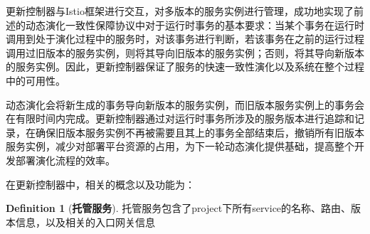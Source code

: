 \documentclass[a4paper, 12pt]{article}
\theoremstyle{definition}
\newtheorem{definition}{Definition}[section]
\begin{document}
更新控制器与Istio框架进行交互，对多版本的服务实例进行管理，成功地实现了前述的动态演化一致性保障协议中对于运行时事务的基本要求：当某个事务在运行时调用到处于演化过程中的服务时，对该事务进行判断，若该事务在之前的运行过程调用过旧版本的服务实例，则将其导向旧版本的服务实例；否则，将其导向新版本的服务实例。因此，更新控制器保证了服务的快速一致性演化以及系统在整个过程中的可用性。

动态演化会将新生成的事务导向新版本的服务实例，而旧版本服务实例上的事务会在有限时间内完成。更新控制器通过对运行时事务所涉及的服务版本进行追踪和记录，在确保旧版本服务实例不再被需要且其上的事务全部结束后，撤销所有旧版本服务实例，减少对部署平台资源的占用，为下一轮动态演化提供基础，提高整个开发部署演化流程的效率。

在更新控制器中，相关的概念以及功能为：
\theoremstyle{definition}
\begin{definition}[\textbf{托管服务}]
\label{definition:managedService}
托管服务包含了project下所有service的名称、路由、版本信息，以及相关的入口网关信息
\end{definition}
\end{document}
